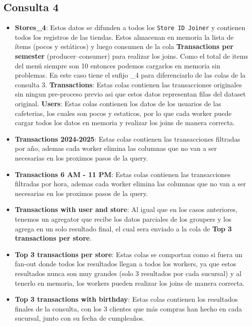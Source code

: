 \documentclass[titlepage,a4paper]{article}
\begin{document}
\subsection*{Consulta 4}
\begin{itemize}
    \item \textbf{Stores\_4}: Estos datos se difunden a todos los \texttt{Store ID Joiner} y contienen todos los registros de las tiendas. Estos almacenan en memoria la lista de ítems (pocos y estáticos) y luego consumen de la cola \textbf{Transactions per semester} (producer--consumer) para realizar los joins. Como el total de items del menú siempre son 10 entonces podemos cargarlos en memoria sin problemas. En este caso tiene el sufijo \_4 para diferenciarlo de las colas de la consulta 3.\newline
    \textbf{Transactions}: Estas colas contienen las transacciones originales sin ningun pre-proceso previo asi que estos datos representan filas del dataset original.
    \textbf{Users}: Estas colas contienen los datos de los usuarios de las cafeterias, los cuales son pocos y estaticos, por lo que cada worker puede cargar todos los datos en memoria y realizar los joins de manera correcta.
    \item \textbf{Transactions 2024-2025}: Estas colas contienen las transacciones filtradas por año, ademas cada worker elimina las columnas que no van a ser necesarias en los proximos pasos de la query.
    \item \textbf{Transactions 6 AM - 11 PM}: Estas colas contienen las transacciones filtradas por hora, ademas cada worker elimina las columnas que no van a ser necesarias en los proximos pasos de la query.
    \item \textbf{Transactions with user and store}: Al igual que en los casos anteriores, tenemos un agregator que recibe los datos parciales de los groupers y los agrega en un solo resultado final, el cual sera enviado a la cola de \textbf{Top 3 transactions per store}.
    \item \textbf{Top 3 transactions per store}: Estas colas se comportan como si fuera un fan-out donde todos los resultados llegan a todos los workers, ya que estos resultados nunca son muy grandes (solo 3 resultados por cada sucursal) y al tenerlo en memoria, los workers pueden realizar los joins de manera correcta.
    \item \textbf{Top 3 transactions with birthday}: Estas colas contienen los resultados finales de la consulta, con los 3 clientes que más compras han hecho en cada sucursal, junto con su fecha de cumpleaños.
\end{itemize}
\end{document}
